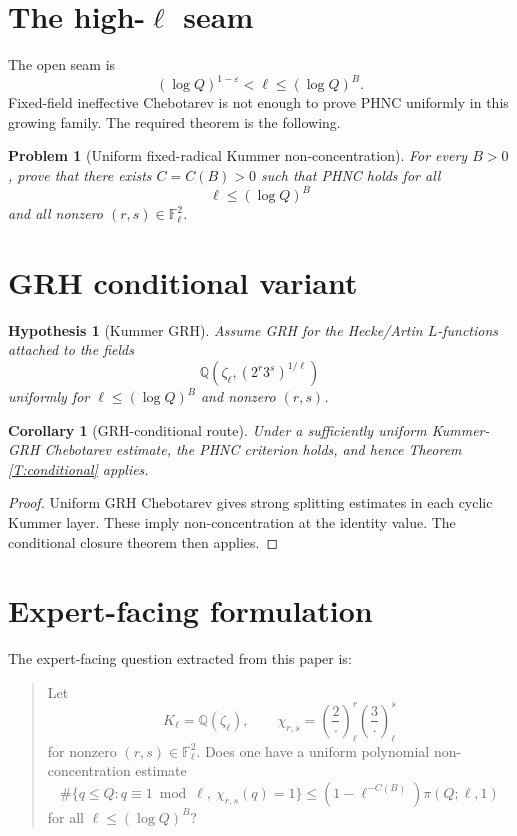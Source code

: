 \documentclass[11pt]{article}
\newtheorem{corollary}{Corollary}
\newtheorem{hypothesis}{Hypothesis}
\newtheorem{problem}{Problem}
\newcommand{\Q}{\mathbb Q}
\newcommand{\F}{\mathbb F}
\newcommand{\1}{\mathbf 1}
\begin{document}
\section{The high-\(\ell\) seam}

The open seam is
\[
(\log Q)^{1-\varepsilon}<\ell\le(\log Q)^B.
\]
Fixed-field ineffective Chebotarev is not enough to prove PHNC uniformly in this growing family.  The required theorem is the following.

\begin{problem}[Uniform fixed-radical Kummer non-concentration]
For every \(B>0\), prove that there exists \(C=C(B)>0\) such that PHNC holds for all
\[
\ell\le(\log Q)^B
\]
and all nonzero \((r,s)\in\F_\ell^2\).
\end{problem}

\section{GRH conditional variant}

\begin{hypothesis}[Kummer GRH]
Assume GRH for the Hecke/Artin \(L\)-functions attached to the fields
\[
\Q(\zeta_\ell,(2^r3^s)^{1/\ell})
\]
uniformly for \(\ell\le(\log Q)^B\) and nonzero \((r,s)\).
\end{hypothesis}

\begin{corollary}[GRH-conditional route]
Under a sufficiently uniform Kummer-GRH Chebotarev estimate, the PHNC criterion holds, and hence Theorem \ref{T:conditional} applies.
\end{corollary}

\begin{proof}
Uniform GRH Chebotarev gives strong splitting estimates in each cyclic Kummer layer.  These imply non-concentration at the identity value.  The conditional closure theorem then applies.
\end{proof}



\section{Expert-facing formulation}

The expert-facing question extracted from this paper is:

\begin{quote}
Let
\[
K_\ell=\Q(\zeta_\ell),\qquad
\chi_{r,s}=\left(\frac{2}{\cdot}\right)_\ell^r
\left(\frac{3}{\cdot}\right)_\ell^s
\]
for nonzero \((r,s)\in\F_\ell^2\).  Does one have a uniform polynomial non-concentration estimate
\[
\#\{q\le Q:q\equiv1\bmod\ell,\ \chi_{r,s}(q)=1\}
\le
(1-\ell^{-C(B)})\pi(Q;\ell,1)
\]
for all \(\ell\le(\log Q)^B\)?
\end{quote}
\end{document}
